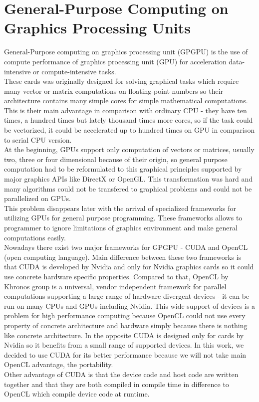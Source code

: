 \chapter{General-Purpose Computing on Graphics Processing Units}
General-Purpose computing on graphics processing unit (GPGPU) is the use of compute performance of graphics processing unit (GPU) for acceleration data-intensive or compute-intensive tasks.\\
These cards was originally designed for solving graphical tasks which require many vector or matrix computations on floating-point numbers so their architecture contains many simple cores for simple mathematical computations. This is their main advantage in comparison with ordinary CPU - they have ten times, a hundred times but lately thousand times more cores, so if the task could be vectorized, it could be accelerated up to hundred times on GPU in comparison to serial CPU version.\\
At the beginning, GPUs support only computation of vectors or matrices, usually two, three or four dimensional because of their origin, so general purpose computation had to be reformulated to this graphical principles supported by major graphics APIs like DirectX or OpenGL. This transformation was hard and many algorithms could not be transfered to graphical problems and could not be parallelized on GPUs.\\
This problem disappears later with the arrival of specialized frameworks for utilizing GPUs for general purpose programming. These frameworks allows to programmer to ignore limitations of graphics environment and make general computations easily.\\
Nowadays there exist two major frameworks for GPGPU - CUDA and OpenCL (open computing language). Main difference between these two frameworks is that CUDA is developed by Nvidia and only for Nvidia graphics cards so it could use concrete hardware specific properties. Compared to that, OpenCL by Khronos group is a universal, vendor independent framework for parallel computations supporting a large range of hardware divergent devices - it can be run on many CPUs and GPUs including Nvidia. This wide support of devices is a problem for high performance computing because OpenCL could not use every property of concrete architecture and hardware simply because there is nothing like concrete architecture. In the opposite CUDA is designed only for cards by Nvidia so it benefits from a small range of supported devices. In this work, we decided to use CUDA for its better performance because we will not take main OpenCL advantage, the portability.\\
Other advantage of CUDA is that the device code and host code are written together and that they are both compiled in compile time in difference to OpenCL which compile device code at runtime.

